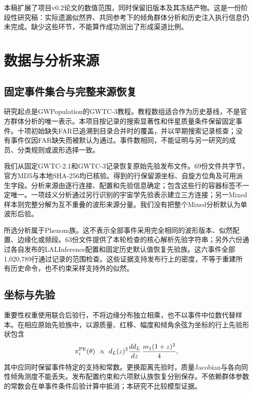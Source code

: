 本稿扩展了项目v0.2论文的数值范围，同时保留旧版本及其冻结产物。这是一份阶段性研究稿：实际遗漏似然界、共同参考下的倾角群体分析和历史注入执行信息仍未完成。缺少这些环节，不能算作成功测出了形成渠道比例。

\section{数据与分析来源}\label{sec:data}
\subsection{固定事件集合与完整来源恢复}
研究起点是GWPopulation的GWTC-3教程\cite{tutorial}。教程数组适合作为历史基线，不是官方群体分析的唯一表示。本项目按记录的搜索显著性和伴星质量条件保留固定\DataEvents{}事件。十项初始缺失FAR已追溯到目录合并时的覆盖，并以早期搜索记录核查；没有事件仅因FAR缺失而被默认为通过。事件数相同，不能证明与另一研究的成员、分类规则或波形选择一致。

我们从固定GWTC-2.1和GWTC-3记录恢复原始先验发布文件\cite{pe21,pe3}。69份文件共\DataBytes{}字节，官方MD5与本地SHA-256均已核验。得到的\DataRows{}行保留源坐标、自旋方位角及可用派生字段。分析来源由逐行连接、配置和先验信息确定；包含这些行的容器标签不一定唯一。一项歧义分析通过另行识别的宇宙学先验表示建立三方连接；另一Mixed样本则完整分解为互不重叠的波形来源分量。我们没有把整个Mixed分析默认为单波形后验。

所选分析属于Phenom族。这不表示全部事件采用完全相同的波形版本、似然配置、边缘化或频段。63份文件提供了本轮检查的核心解析先验字符串；另外六份通过各自发布的LALInference配置和固定历史默认值恢复先验族。这六事件全部1,020,789行通过记录的范围检查。这些证据支持发布行上的密度，不等于重建所有历史命令，也不约束采样支持外的似然。

\subsection{坐标与先验}
重要性权重使用联合后验行，不将边缘分布独立相乘，也不以事件中位数代替样本。在相应原始先验族中，以源质量、红移、幅度和倾角余弦为坐标的行上先验形状包含
\begin{equation}
 \pi_i^{\rm PE}(\theta)\ \propto\ d_L(z)^2\frac{d d_L}{dz}\,
 \frac{m_1(1+z)^2}{4},\label{eq:prior}
\end{equation}
其中应同时保留事件特定的支持和常数。更换距离先验时，质量Jacobian与各向同性倾角测度不能丢失。发布配置约束和六项默认族恢复分别保存。不依赖群体参数的常数会在单事件条件后验计算中抵消；本研究不比较模型证据。

